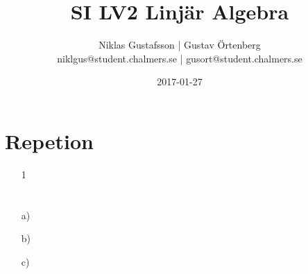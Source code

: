 \documentclass{article}
\title{SI LV2 Linjär Algebra}
\author{Niklas Gustafsson | Gustav Örtenberg  \\ \small{niklgus@student.chalmers.se} | \small{gusort@student.chalmers.se}}
\date{2017-01-27}
\begin{document}
\maketitle
\section*{Repetion}
\begin{itemize}
	\item[1] 
\end{itemize}
\newpage
\section{}


\section{}
\begin{itemize}
	\item[a) ] 
	\item[b) ] 
	\item[c) ] 
\end{itemize}

\section{}


\section{}


\section{}


\section{}

\end{document}
